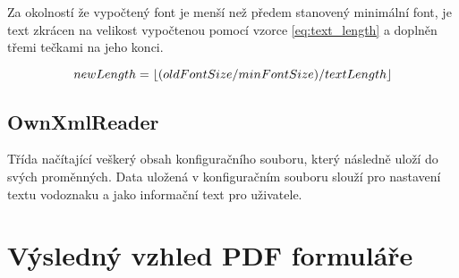 Za okolností že vypočtený font je menší než předem stanovený minimální font, je text zkrácen na velikost vypočtenou pomocí vzorce  \eqref{eq:text_length} a doplněn třemi tečkami na jeho konci. 

\begin{equation}
newLength = \floor*{(oldFontSize / minFontSize) / textLength} \label{eq:text_length}
\end{equation}
\subsection{OwnXmlReader}
Třída načítající veškerý obsah konfiguračního souboru, který následně uloží do svých proměnných. Data uložená v konfiguračním souboru slouží pro nastavení textu vodoznaku a jako informační text pro uživatele.
\section{Výsledný vzhled PDF formuláře}


